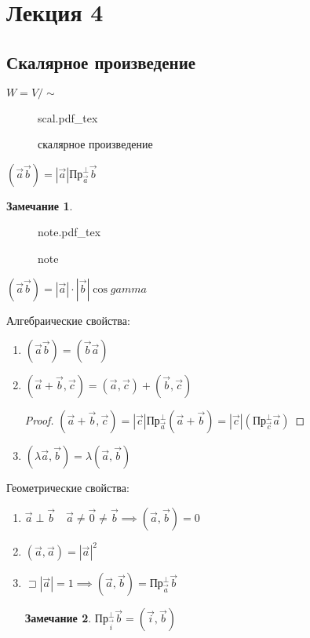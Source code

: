 \documentclass{book}
\theoremstyle{definition}
\newtheorem*{note}{Замечание}
\newcommand{\incfig}[1]{%
    \def\svgwidth{\columnwidth}
    {#1.pdf_tex}
}
\begin{document}
\section{Лекция 4}

\subsection{Скалярное произведение}

$W = V / \sim $

\begin{figure}[ht]
    \centering
    \incfig{scal}
    \caption{скалярное произведение}
    \label{fig:scal}
\end{figure}

\begin{definition}
    $(\vec a\vec b) = \left| \vec a \right| \text{Пр}_{\vec a}^{\perp}\vec b$
\end{definition}

\begin{note}
\begin{figure}[ht]
    \centering
    \incfig{note}
    \caption{note}
    \label{fig:note}
\end{figure}

$(\vec a\vec b) = \left| \vec a \right| \cdot  \left| \vec b \right| \cos gamma $
\end{note}


Алгебраические свойства:
\begin{enumerate}
    \item $\left( \vec a\vec b \right)  = \left( \vec b\vec a \right) $
    \item $\left( \vec a+\vec b, \vec c \right)  = \left( \vec a, \vec c \right) + \left( \vec b, \vec c \right) $
        \begin{proof}
            $(\vec a + \vec b, \vec c) = \left| \vec c  \right| \text{Пр}_{\vec a}^{\perp} \left( \vec a + \vec b \right)  = \left| \vec c \right| \left( \text{Пр}_{\vec c}^{\perp} \vec a \right) $
        \end{proof}
    \item $(\lambda \vec a, \vec b) = \lambda (\vec a, \vec b)$
\end{enumerate}

Геометрические свойства:
\begin{enumerate}
    \item $\vec a \perp \vec b\quad \vec a\neq \vec 0 \neq \vec b \implies  (\vec a, \vec b) = 0
        $
    \item $(\vec a, \vec a) = \left| \vec a \right| ^2$
    \item $\sqsupset \left| \vec a \right|  = 1 \implies  (\vec a, \vec b) = \text{Пр}_{\vec a}^{\perp}\vec b$ 
        \begin{note}
            $\text{Пр}_{\vec i}^{\perp}\vec b = (\vec i, \vec b)$
        \end{note}
\end{enumerate}
\end{document}
